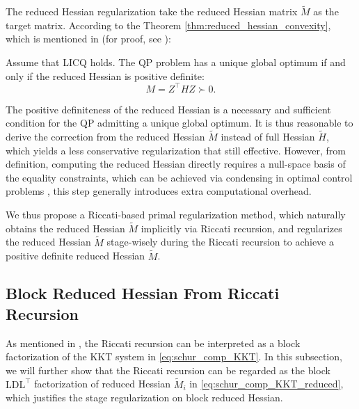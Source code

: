\documentclass[class=scrbook, crop=false]{standalone}
\begin{document}
The reduced Hessian regularization take the reduced Hessian matrix $\tilde{M}$ as the target matrix.
According to the Theorem \ref{thm:reduced_hessian_convexity}, 
which is mentioned in \cite{verschueren2017sparsity} (for proof, see \cite{nocedal2006numerical}):

\begin{theorem}
\label{thm:reduced_hessian_convexity}
Assume that LICQ holds. The QP problem has a unique global optimum if and only if the reduced Hessian is positive definite:
\begin{equation}
    M = Z^\top H Z \succ 0.
\end{equation}
\end{theorem}

The positive definiteness of the reduced Hessian is a necessary and sufficient condition for the QP admitting a unique global optimum.
It is thus reasonable to derive the correction from the reduced Hessian $\tilde{M}$ instead of full Hessian $\tilde{H}$, 
which yields a less conservative regularization that still effective.
However, from definition, 
computing the reduced Hessian directly requires a null-space basis of the equality constraints,
which can be achieved via condensing in optimal control problems \cite{frisonEfficientImplementationPartial2016}, 
this step generally introduces extra computational overhead.

We thus propose a Riccati-based primal regularization method, which naturally obtains the reduced Hessian $\tilde{M}$ implicitly via Riccati recursion,
and regularizes the reduced Hessian $\tilde{M}$ stage-wisely during the Riccati recursion to achieve a positive definite reduced Hessian $\tilde{M}$.

\subsection{Block Reduced Hessian From Riccati Recursion}
\label{subsec:block_reduced_hessian}
As mentioned in \cite{frisonAlgorithmsMethodsHighPerformance}, 
the Riccati recursion can be interpreted as a block factorization of the KKT system in \eqref{eq:schur_comp_KKT}.
In this subsection, we will further show that the Riccati recursion 
can be regarded as the block $\mathrm{LD}\mathrm{L}^\top$ factorization of reduced Hessian $\tilde{M}_i$ in \eqref{eq:schur_comp_KKT_reduced},
which justifies the stage regularization on block reduced Hessian.
\end{document}
